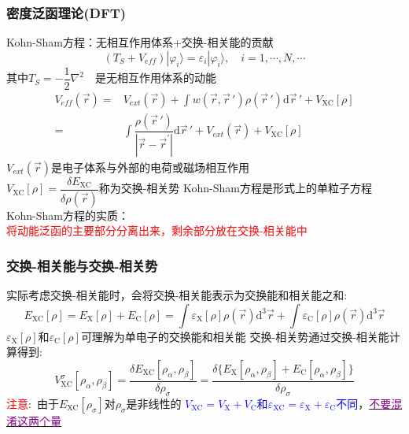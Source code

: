 \frame                               %
{
\frametitle{密度泛函理论(\textrm{DFT})}
\textrm{Kohn-Sham}方程：无相互作用体系+交换-相关能的贡献
$$(T_S+V_{e\!f\!f})|\varphi_i\rangle=\varepsilon_i|\varphi_i\rangle,\quad i=1,\cdots,N,\cdots$$
其中$T_S=-\dfrac12\nabla^2$~~是无相互作用体系的动能
\begin{displaymath}
	\begin{aligned}
		V_{e\!f\!f}(\vec r)=&V_{ext}(\vec r)+\displaystyle\int w(\vec r,\vec r\,')\rho(\vec r\,')\mathrm{d}\vec r\,'+V_{\mathrm{XC}}[\rho]\\
=&\displaystyle\int\dfrac{\rho(\vec r\,')}{|\vec r-\vec r^{\prime}|}\mathrm{d}\vec r\,'+V_{ext}(\vec r)+V_{\mathrm{XC}}[\rho]
	\end{aligned}
\end{displaymath}
$V_{ext}(\vec r)$是电子体系与外部的电荷或磁场相互作用\\
$V_{\mathrm{XC}}[\rho]=\dfrac{\delta E_{\mathrm{XC}}}{\delta\rho(\vec r)}$称为交换-相关势
\vskip 10pt
\textrm{Kohn-Sham}方程是形式上的单粒子方程
\vskip 6pt
\textrm{Kohn-Sham}方程的实质：\\\textcolor{red}{将动能泛函的主要部分分离出来，剩余部分放在交换-相关能中}
}

\frame
{
\frametitle{交换-相关能与交换-相关势}
实际考虑交换-相关能时，会将交换-相关能表示为交换能和相关能之和:
\begin{displaymath}
	E_{\mathrm{XC}}[\rho]=E_{\mathrm{X}}[\rho]+E_{\mathrm{C}}[\rho]=\int\varepsilon_{\mathrm{X}}[\rho]\rho(\vec{r}) \textrm{d}^3\vec{r}+\int\varepsilon_{\mathrm{C}}[\rho]\rho(\vec{r}) \textrm{d}^3\vec{r}
\end{displaymath}
$\varepsilon_{\mathrm{X}}[\rho]$和$\varepsilon_{\mathrm{C}}[\rho]$可理解为单电子的交换能和相关能
\vskip 20pt
交换-相关势通过交换-相关能计算得到:~
		\begin{displaymath}
			V_{\mathrm{XC}}^{\sigma}[\rho_{\alpha},\rho_{\beta}]=\dfrac{\delta E_{\mathrm{XC}}[\rho_{\alpha},\rho_{\beta}]}{\delta\rho_{\sigma}}=\dfrac{\delta\{E_{\mathrm{X}}[\rho_{\alpha},\rho_{\beta}]+E_{\mathrm{C}}[\rho_{\alpha},\rho_{\beta}]\}}{\delta\rho_{\sigma}}
		\end{displaymath}
		\textcolor{red}{注意}:~由于$E_{\mathrm{XC}}[\rho_{\sigma}]$对$\rho_{\sigma}$是非线性的
		\vskip 8pt
		\textcolor{blue}{$V_{\mathrm{XC}}=V_{\mathrm{X}}+V_{\mathrm{C}}$和$\varepsilon_{\mathrm{XC}}=\varepsilon_{\mathrm{X}}+\varepsilon_{\mathrm{C}}$不同}，\underline{\textcolor{purple}{不要混淆这两个量}}
}

